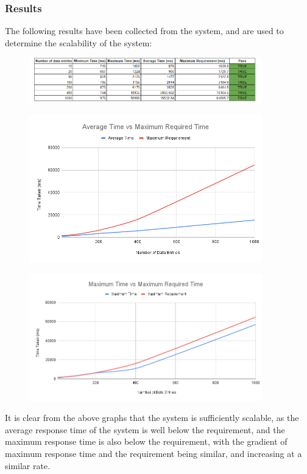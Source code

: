 \documentclass[12pt]{article}
\begin{document}
\subsubsection{Results}
The following results have been collected from the system, and are used to determine the scalability of the system:
\begin{figure}[H]
    \centering
    \includegraphics[width=0.9\textwidth]{Scalability.png}
\end{figure}
\begin{figure}[H]
    \centering
    \includegraphics[width=0.9\textwidth]{Average Time vs Maximum Required Time.png}
\end{figure}
\begin{figure}[H]
    \centering
    \includegraphics[width=0.9\textwidth]{Maximum Time vs Maximum Required Time.png}
\end{figure}
It is clear from the above graphs that the system is sufficiently scalable, as the average response time of the system is well below the requirement, and the maximum response time is also below the requirement, with the gradient of maximum response time and the requirement being similar, and increasing at a similar rate.
\end{document}
